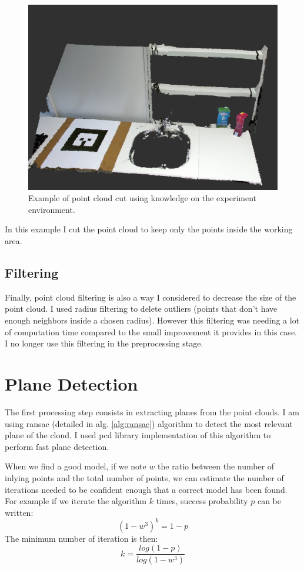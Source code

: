 \begin{figure}[h!]
\centering
\includegraphics[width=\textwidth]{images/cut.png}
\caption{Example of point cloud cut using knowledge on the experiment environment.}
\label{fig:cut}
\end{figure}

In this example I cut the point cloud to keep only the points inside the working area.

\subsection{Filtering}

Finally, point cloud filtering is also a way I considered to decrease the size of the point cloud. I used radius filtering to delete outliers (points that don’t have enough neighbors inside a chosen radius). However this filtering was needing a lot of computation time compared to the small improvement it provides in this case. I no longer use this filtering in the preprocessing stage. 

\section{Plane Detection}

The first processing step consists in extracting planes from the point clouds. I am using \acrshort{ransac} (detailed in alg. \ref{alg:ransac}) algorithm to detect the most relevant plane of the cloud. I used \acrshort{pcd} \gls{library} implementation of this algorithm to perform fast plane detection.

When we find a good model, if we note $w$ the ratio between the number of inlying points and the total number of points, we can estimate the number of iterations needed to be confident enough that a correct model has been found. For example if we iterate the algorithm $k$ times, success probability $p$ can be written:
\[
    (1-w^3)^k=1-p
\]
The minimum number of iteration is then:
\[
    k=\frac{log(1-p)}{log(1-w^3)}
\]

